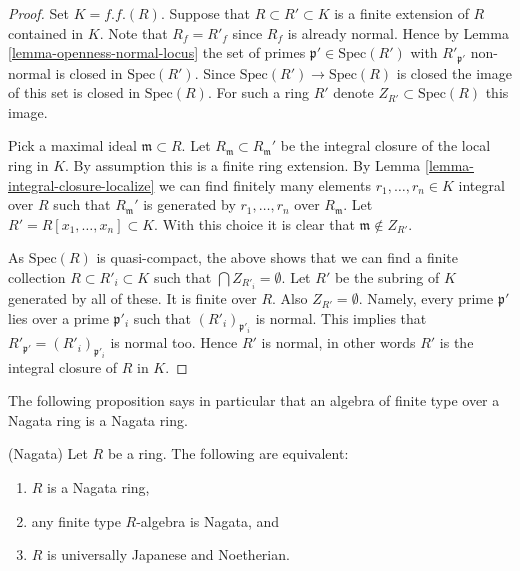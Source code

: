 \begin{proof}
Set $K = f.f.(R)$. Suppose that $R \subset R' \subset K$ is a finite
extension of $R$ contained in $K$. Note that $R_f = R'_f$ since
$R_f$ is already normal. Hence by Lemma \ref{lemma-openness-normal-locus}
the set of primes
$\mathfrak p' \in \text{Spec}(R')$ with $R'_{\mathfrak p'}$ non-normal
is closed in $\text{Spec}(R')$. Since $\text{Spec}(R') \to \text{Spec}(R)$
is closed the image of this set is closed in $\text{Spec}(R)$.
For such a ring $R'$ denote $Z_{R'} \subset \text{Spec}(R)$ this image.

\medskip\noindent
Pick a maximal ideal $\mathfrak m \subset R$.
Let $R_{\mathfrak m} \subset R_{\mathfrak m}'$ be the integral
closure of the local ring in $K$. By assumption this is
a finite ring extension. By Lemma \ref{lemma-integral-closure-localize}
we can find finitely
many elements $r_1, \ldots, r_n \in K$ integral over $R$ such that
$R_{\mathfrak m}'$ is generated by $r_1, \ldots, r_n$ over $R_{\mathfrak m}$.
Let $R' = R[x_1, \ldots, x_n] \subset K$. With this choice it is clear
that $\mathfrak m \not \in Z_{R'}$.

\medskip\noindent
As $\text{Spec}(R)$ is quasi-compact, the above shows that we can
find a finite collection $R \subset R'_i \subset K$ such that
$\bigcap Z_{R'_i} = \emptyset$. Let $R'$ be the subring of $K$
generated by all of these. It is finite over $R$. Also $Z_{R'} = \emptyset$.
Namely, every prime $\mathfrak p'$ lies over a prime $\mathfrak p'_i$
such that $(R'_i)_{\mathfrak p'_i}$ is normal. This implies
that $R'_{\mathfrak p'} = (R'_i)_{\mathfrak p'_i}$ is normal too.
Hence $R'$ is normal, in other words
$R'$ is the integral closure of $R$ in $K$.
\end{proof}

\noindent
The following proposition says in particular that an algebra of finite
type over a Nagata ring is a Nagata ring.

\begin{proposition}
\label{proposition-nagata-universally-japanese}
(Nagata) Let $R$ be a ring. The following are equivalent:
\begin{enumerate}
\item $R$ is a Nagata ring,
\item any finite type $R$-algebra is Nagata, and
\item $R$ is universally Japanese and Noetherian.
\end{enumerate}
\end{proposition}

